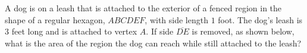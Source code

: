 A dog is on a leash that is attached to the exterior of a fenced region in the shape of a regular hexagon, $ABCDEF$, with side length $1$ foot. The dog's leash is $3$ feet long and is attached to vertex $A$. If side $\overline{DE}$ is removed, as shown below, what is the area of the region the dog can reach while still attached to the leash?
